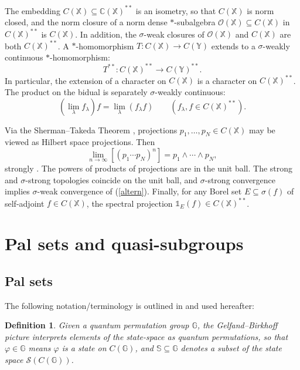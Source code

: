 \documentclass[12pt]{amsart}
\newtheorem{definition}[theorem]{Definition}
\theoremstyle{remark}
\theoremstyle{remark}
\begin{document}
The embedding $C(\mathbb{X})\subseteq \mathbb{C}(\mathbb{X})^{**}$ is an isometry, so that $C(\mathbb{X})$ is norm closed, and the norm closure of a norm dense $\ast$-subalgebra $\mathcal{O}(\mathbb{X})\subseteq C(\mathbb{X})$ in $C(\mathbb{X})^{**}$ is $C(\mathbb{X})$. In addition, the $\sigma$-weak closures of $\mathcal{O}(\mathbb{X})$ and $C(\mathbb{X})$ are both $C(\mathbb{X})^{**}$. A $\ast$-homomorphism $T:C(\mathbb{X})\to C(\mathbb{Y})$ extends to a $\sigma$-weakly continuous $\ast$-homomorphism:
$$T^{**}:C(\mathbb{X})^{**}\to C(\mathbb{Y})^{**}.$$
In particular, the extension of a character on $C(\mathbb{X})$ is a character on $C(\mathbb{X})^{**}$. The product on the bidual is separately $\sigma$-weakly continuous:
$$\left(\lim_\lambda f_\lambda\right)f=\lim_\lambda(f_\lambda f)\qquad (f_\lambda,f\in C(\mathbb{X})^{**}).$$

Via the Sherman--Takeda Theorem \cite{she,tak}, projections $p_1,\dots,p_N\in C(\mathbb{X})$ may be viewed as Hilbert space projections. Then
\begin{equation}\lim_{n\to \infty}[(p_1\cdots p_N)^n]=p_1\wedge\cdots\wedge p_N,\label{altern}\end{equation}
strongly \cite{hal}. The powers of products of projections are in the unit ball. The strong and $\sigma$-strong topologies coincide on the unit ball, and $\sigma$-strong convergence implies $\sigma$-weak convergence of (\ref{altern}). Finally, for any Borel set $E\subseteq \sigma(f)$ of self-adjoint $f\in C(\mathbb{X})$, the spectral projection $\mathds{1}_E(f)\in C(\mathbb{X})^{**}$.


\section{Pal sets and quasi-subgroups\label{palquasi}}
\subsection{Pal sets}
The following notation/terminology is outlined in \cite{mcc} and used hereafter:
\begin{definition}\label{gelbir}
Given a quantum permutation group $\mathbb{G}$,
the \emph{Gelfand--Birkhoff picture} interprets elements of the state-space as quantum permutations, so that $\varphi\in \mathbb{G}$ means $\varphi$ is a state on $C(\mathbb{G})$, and $\mathbb{S}\subseteq \mathbb{G}$ denotes a subset of the state space $\mathcal{S}(C(\mathbb{G}))$.
\end{definition}
\end{document}
